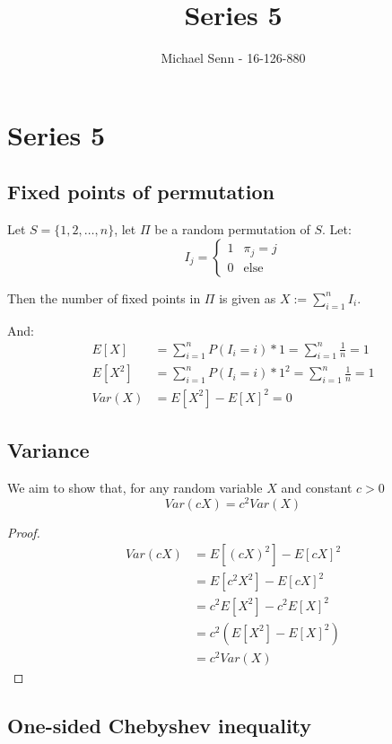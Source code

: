 \documentclass[a4paper]{scrreprt}
\title{Series 5}
\author{Michael Senn \maillink{michael.senn@students.unibe.ch} - 16-126-880}
\date{\printdate}
\begin{document}
\maketitle


\setcounter{chapter}{4}
\chapter{Series 5}

\section{Fixed points of permutation}

Let $S = \{1, 2, \ldots, n\}$, let $\Pi$ be a random permutation of $S$.
Let:
\[
	I_{j} =
	\begin{cases}
		1 & \pi_j = j \\
		0 & \text{else}
	\end{cases}
\]

Then the number of fixed points in $\Pi$ is given as $X := \sum_{i=1}^n{I_i}$.

And:
\begin{align*}
	E[X] & = \sum_{i=1}^n{P(I_i = i) * 1} = \sum_{i=1}^n{\frac{1}{n}} = 1 \\
	E[X^2] & = \sum_{i=1}^n{P(I_i = i) * 1^2} = \sum_{i=1}^n{\frac{1}{n}} = 1 \\
	Var(X) & = E[X^2] - E[X]^2 = 0
\end{align*}

\section{Variance}

We aim to show that, for any random variable $X$ and constant $c > 0$
\[
	Var(cX) = c^2 Var(X)
\]
	
\begin{proof}

	\begin{align*}
		Var(cX) & = E[(cX)^2] - E[cX]^2 \\
			& = E[c^2 X^2] - E[cX]^2 \\
			& = c^2 E[X^2] - c^2 E[X]^2 \\
			& = c^2 (E[X^2] - E[X]^2) \\
			& = c^2 Var(X)
	\end{align*}
\end{proof}

\section{One-sided Chebyshev inequality}
\end{document}
